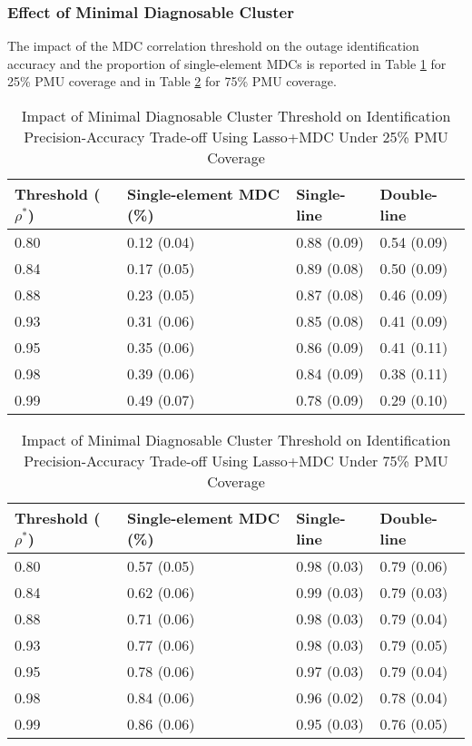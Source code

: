 \subsubsection{Effect of Minimal Diagnosable Cluster}

The impact of the MDC correlation threshold on the outage identification accuracy and the proportion of single-element MDCs is reported in Table \ref{ch5:tab:impact_mdc_threshold_10pmus} for 25\% PMU coverage and in Table \ref{ch5:tab:impact_mdc_threshold_29pmus} for 75\% PMU coverage. 
\begin{table}[!th]
\caption{Impact of Minimal Diagnosable Cluster Threshold on Identification Precision-Accuracy Trade-off Using Lasso+MDC Under 25\% PMU Coverage}
\label{ch5:tab:impact_mdc_threshold_10pmus}
\centering
\begin{tabular}{llll}
\hline
\hline
Threshold ($\rho^*$)  & Single-element MDC (\%) & Single-line & Double-line \\
\hline
0.80 & 0.12 (0.04) & 0.88 (0.09) & 0.54 (0.09) \\
0.84 & 0.17 (0.05) & 0.89 (0.08) & 0.50 (0.09) \\
0.88 & 0.23 (0.05) & 0.87 (0.08) & 0.46 (0.09) \\
0.93 & 0.31 (0.06) & 0.85 (0.08) & 0.41 (0.09) \\
0.95 & 0.35 (0.06) & 0.86 (0.09) & 0.41 (0.11) \\
0.98 & 0.39 (0.06) & 0.84 (0.09) & 0.38 (0.11) \\
0.99 & 0.49 (0.07) & 0.78 (0.09) & 0.29 (0.10) \\
\hline 
\end{tabular}
\end{table}

\begin{table}[!th]
\caption{Impact of Minimal Diagnosable Cluster Threshold on Identification Precision-Accuracy Trade-off Using Lasso+MDC Under 75\% PMU Coverage}
\label{ch5:tab:impact_mdc_threshold_29pmus}
\centering
\begin{tabular}{llll}
\hline
\hline
Threshold ($\rho^*$)  & Single-element MDC (\%) & Single-line & Double-line \\
\hline
0.80 & 0.57 (0.05) & 0.98 (0.03) & 0.79 (0.06) \\
0.84 & 0.62 (0.06) & 0.99 (0.03) & 0.79 (0.03) \\
0.88 & 0.71 (0.06) & 0.98 (0.03) & 0.79 (0.04) \\
0.93 & 0.77 (0.06) & 0.98 (0.03) & 0.79 (0.05) \\
0.95 & 0.78 (0.06) & 0.97 (0.03) & 0.79 (0.04) \\
0.98 & 0.84 (0.06) & 0.96 (0.02) & 0.78 (0.04) \\
0.99 & 0.86 (0.06) & 0.95 (0.03) & 0.76 (0.05) \\
\hline 
\end{tabular}
\end{table}

